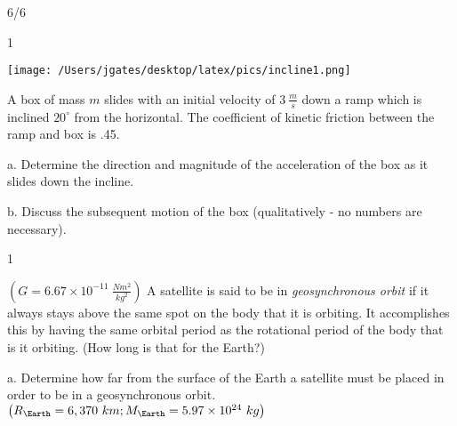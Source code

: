 


\hfill {\large 6/6}
\bigskip


\AddToShipoutPicture*{\BackgroundPic}

\addtocounter {ProbNum} {1}

\begin{floatingfigure}[r]{.25\textwidth}
\texttt{[image: /Users/jgates/desktop/latex/pics/incline1.png]}
\end{floatingfigure} 

{\bf \Large{}} A box of mass ${m}$ slides with an initial velocity of ${3~\tfrac{m}{s}}$ down a ramp which is inclined ${20^\circ}$ from the horizontal.  The coefficient of kinetic friction between the ramp and box is .45.

\bigskip

\indent  a. Determine the direction and magnitude of the acceleration of the box as it slides down the incline. 

\vfill

b. Discuss the subsequent motion of the box (qualitatively - no numbers are necessary).

\vspace{25mm}

\newpage

\AddToShipoutPicture*{\BackgroundPic}

\addtocounter {ProbNum} {1}

{\bf \Large{}} ${\left ( G = 6.67 \times 10^{-11}~\tfrac{Nm^2}{kg^2} \right )}$ A satellite is said to be in \emph{geosynchronous orbit} if it always stays above the same spot on the body that it is orbiting.  It accomplishes this by having the same orbital period as the rotational period of the body that is it orbiting. (How long is that for the Earth?)

\bigskip

a. Determine how far from the surface of the Earth a satellite must be placed in order to be in a geosynchronous orbit. ${\left ( R_{\Earth} = 6,370~km; M_{\Earth}=5.97 \times 10^{24}~kg \right )}$


